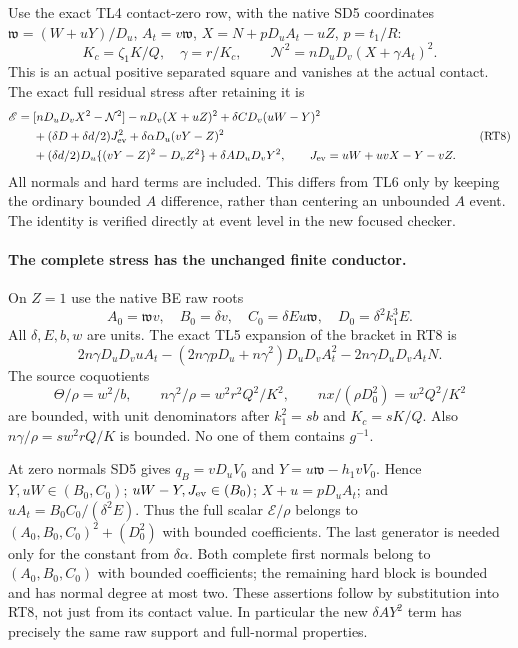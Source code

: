 Use the exact TL4 contact-zero row, with the native SD5 coordinates
$\mathfrak w=(W+uY)/D_u$, $A_t=v\mathfrak w$,
$X=N+pD_uA_t-uZ$, $p=t_1/R$:
\[
 K_c=\zeta_1K/Q,\quad\gamma=r/K_c,\qquad
 \mathcal N^2=nD_uD_v(X+\gamma A_t)^2.                \tag{RT7}
\]
This is an actual positive separated square and vanishes at the actual
contact. The exact full residual stress after retaining it is
\[
\begin{split}
 \mathscr E={}&[nD_uD_vX^2-\mathcal N^2]
   -nD_v(X+uZ)^2+\delta C D_v(uW-Y)^2\\
 &+(\delta D+\delta d/2)J_{\rm ev}^2
   +\delta\alpha D_u(vY-Z)^2\\
 &+(\delta d/2)D_u\{(vY-Z)^2-D_vZ^2\}
   +\delta A D_uD_vY^2,\qquad
 J_{\rm ev}=uW+uvX-Y-vZ.
\end{split} \tag{RT8}
\]
All normals and hard terms are included. This differs from TL6 only
by keeping the ordinary bounded $A$ difference, rather than centering
an unbounded $A$ event. The identity is verified directly at event
level in the new focused checker.

\paragraph{The complete stress has the unchanged finite conductor.}
On $Z=1$ use the native BE raw roots
\[
 A_0=\mathfrak wv,\quad B_0=\delta v,\quad
 C_0=\delta E u\mathfrak w,\quad D_0=\delta^2 k_1^3E.
\]
All $\delta,E,b,w$ are units. The exact TL5 expansion of the bracket in RT8 is
\[
 2n\gamma D_uD_vuA_t
 -(2n\gamma pD_u+n\gamma^2)D_uD_v A_t^2
 -2n\gamma D_uD_v A_tN.                             \tag{RT9}
\]
The source coquotients
\[
 \Theta/\rho=w^2/b,\qquad
 n\gamma^2/\rho=w^2r^2Q^2/K^2,\qquad
 nx/(\rho D_0^2)=w^2Q^2/K^2
\]
are bounded, with unit denominators after $k_1^2=sb$ and $K_c=sK/Q$.
Also $n\gamma/\rho=sw^2rQ/K$ is bounded. No one of them contains $g^{-1}$.

At zero normals SD5 gives $q_B=vD_uV_0$ and
$Y=u\mathfrak w-h_1vV_0$. Hence $Y,uW\in(B_0,C_0)$;
$uW-Y,J_{\rm ev}\in(B_0)$; $X+u=pD_uA_t$; and
$uA_t=B_0C_0/(\delta^2E)$. Thus the full scalar
$\mathscr E/\rho$ belongs to
$(A_0,B_0,C_0)^2+(D_0^2)$ with bounded coefficients.
The last generator is needed only for the constant from $\delta\alpha$.
Both complete first normals belong to $(A_0,B_0,C_0)$ with bounded
coefficients; the remaining hard block is bounded and has normal
degree at most two. These assertions follow by substitution into RT8,
not just from its contact value. In particular the new $\delta A Y^2$
term has precisely the same raw support and full-normal properties.

